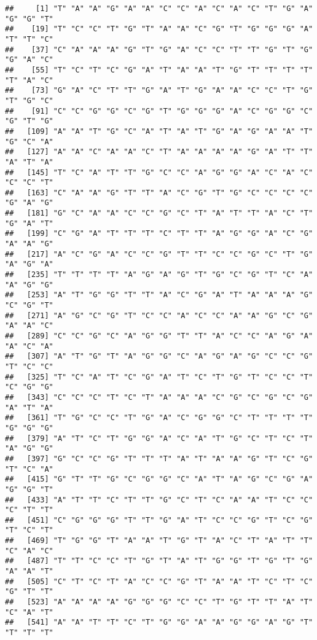 \documentclass[
]{article}
\begin{document}
\begin{verbatim}
##     [1] "T" "A" "A" "G" "A" "A" "C" "C" "A" "C" "A" "C" "T" "G" "A" "G" "G" "T"
##    [19] "T" "C" "C" "T" "G" "T" "A" "A" "C" "G" "T" "G" "G" "G" "A" "T" "T" "C"
##    [37] "C" "A" "A" "A" "G" "T" "G" "A" "C" "C" "T" "T" "G" "T" "G" "G" "A" "C"
##    [55] "T" "C" "T" "C" "G" "A" "T" "A" "A" "T" "G" "T" "T" "T" "T" "T" "A" "C"
##    [73] "G" "A" "C" "T" "T" "G" "A" "T" "G" "A" "A" "C" "C" "T" "G" "T" "G" "C"
##    [91] "C" "C" "G" "G" "C" "G" "T" "G" "G" "G" "A" "C" "G" "G" "C" "G" "T" "G"
##   [109] "A" "A" "T" "G" "C" "A" "T" "A" "T" "G" "A" "G" "A" "A" "T" "G" "C" "A"
##   [127] "A" "A" "C" "A" "A" "C" "T" "A" "A" "A" "A" "G" "A" "T" "T" "A" "T" "A"
##   [145] "T" "C" "A" "T" "T" "G" "C" "C" "A" "G" "G" "A" "C" "A" "C" "C" "C" "T"
##   [163] "C" "A" "A" "G" "T" "T" "A" "C" "G" "T" "G" "C" "C" "C" "C" "G" "A" "G"
##   [181] "G" "C" "A" "A" "C" "C" "G" "C" "T" "A" "T" "T" "A" "C" "T" "G" "A" "T"
##   [199] "C" "G" "A" "T" "T" "T" "C" "T" "T" "A" "G" "G" "A" "C" "G" "A" "A" "G"
##   [217] "A" "C" "G" "A" "C" "C" "G" "T" "T" "C" "C" "G" "C" "T" "G" "A" "G" "A"
##   [235] "T" "T" "T" "T" "A" "G" "A" "G" "T" "G" "C" "G" "T" "C" "A" "A" "G" "G"
##   [253] "A" "T" "G" "G" "T" "T" "A" "C" "G" "A" "T" "A" "A" "A" "G" "C" "G" "T"
##   [271] "A" "G" "C" "G" "T" "C" "C" "A" "C" "C" "A" "A" "G" "C" "G" "A" "A" "C"
##   [289] "C" "C" "G" "C" "A" "G" "G" "T" "T" "A" "C" "C" "A" "G" "A" "A" "C" "A"
##   [307] "A" "T" "G" "T" "A" "G" "G" "C" "A" "G" "A" "G" "C" "C" "G" "T" "C" "C"
##   [325] "T" "C" "A" "T" "C" "G" "A" "T" "C" "T" "G" "T" "C" "C" "T" "C" "G" "G"
##   [343] "C" "C" "C" "T" "C" "T" "A" "A" "A" "C" "G" "C" "G" "C" "G" "A" "T" "A"
##   [361] "T" "G" "C" "C" "T" "G" "A" "C" "G" "G" "C" "T" "T" "T" "T" "G" "G" "G"
##   [379] "A" "T" "C" "T" "G" "G" "A" "C" "A" "T" "G" "C" "T" "C" "T" "A" "G" "G"
##   [397] "G" "C" "C" "G" "T" "T" "T" "A" "T" "A" "A" "G" "T" "C" "G" "T" "C" "A"
##   [415] "G" "T" "T" "G" "C" "G" "G" "C" "A" "T" "A" "G" "C" "G" "A" "G" "G" "T"
##   [433] "A" "T" "T" "C" "T" "T" "G" "C" "T" "C" "A" "A" "T" "C" "C" "C" "T" "T"
##   [451] "C" "G" "G" "G" "T" "T" "G" "A" "T" "C" "C" "G" "T" "C" "G" "T" "C" "T"
##   [469] "T" "G" "G" "T" "A" "A" "T" "G" "T" "A" "C" "T" "A" "T" "T" "C" "A" "C"
##   [487] "T" "T" "C" "C" "T" "G" "T" "A" "T" "G" "G" "T" "G" "T" "G" "A" "A" "T"
##   [505] "C" "T" "C" "T" "A" "C" "C" "G" "T" "A" "A" "T" "C" "T" "C" "G" "T" "T"
##   [523] "A" "A" "A" "A" "G" "G" "G" "C" "C" "T" "G" "T" "T" "A" "T" "C" "A" "T"
##   [541] "A" "A" "T" "T" "C" "T" "G" "G" "A" "A" "G" "G" "A" "G" "T" "T" "T" "T"

\end{verbatim}
\end{document}

